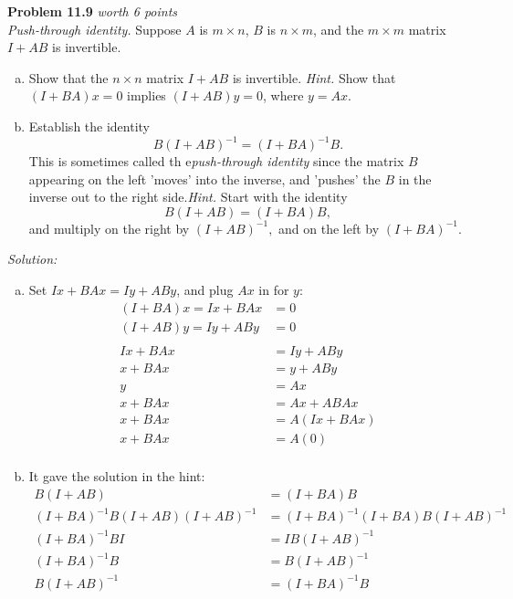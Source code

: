 \documentclass{article}
\newenvironment{problem}[3][Problem]
    { \begin{mdframed}[backgroundcolor=gray!20] \textbf{#1 #2} \textit{worth #3 points} \\}
    {  \end{mdframed}}
\newenvironment{solution}
    {\textit{Solution:}}
    {}
\begin{document}
\begin{problem}{11.9}{6}
\textit{Push-through identity.} Suppose $A$ is $m\times n$, $B$ is $n\times m$, and the $m\times m$ matrix $I+AB$ is invertible.
\begin{enumerate}[(a)]
    \item Show that the $n\times n$ matrix $I+AB$ is invertible. \textit{Hint.} Show that $(I+BA)x=0$ implies $(I+AB)y = 0$, where $y=Ax$.
    \item Establish the identity $$B(I+AB)^{-1} = (I+BA)^{-1}B.$$ This is sometimes called th e\textit{push-through identity} since the matrix $B$ appearing on the left 'moves' into the inverse, and 'pushes' the $B$ in the inverse out to the right side.\textit{Hint.} Start with the identity $$B(I+AB) = (I+BA)B,$$ and multiply on the right by $(I+AB)^{-1},$ and on the left by $(I+BA)^{-1}$.
\end{enumerate}
\end{problem}
\begin{solution}
\begin{enumerate}[(a)]
    \item Set $Ix+BAx=Iy+ABy$, and plug $Ax$ in for $y$:
    \begin{align*}
        (I+BA)x=Ix+BAx &= 0\\
        (I+AB)y=Iy+ABy &= 0\\
        \\
        Ix+BAx&=Iy+ABy\\
        x+BAx&=y+ABy\\
        y&=Ax\\
        x+BAx&=Ax+ABAx\\
        x+BAx&=A(Ix+BAx)\\
        x+BAx&=A(0)\\
    \end{align*}
    \item It gave the solution in the hint:
    \begin{align*}
        B(I+AB) &= (I+BA)B \\
        (I+BA)^{-1}B(I+AB)(I+AB)^{-1} &= (I+BA)^{-1}(I+BA)B(I+AB)^{-1} \\
        (I+BA)^{-1}BI &= IB(I+AB)^{-1}\\
        (I+BA)^{-1}B &= B(I+AB)^{-1}\\
        B(I+AB)^{-1}&=(I+BA)^{-1}B
    \end{align*}
\end{enumerate}
\end{solution}
\end{document}
